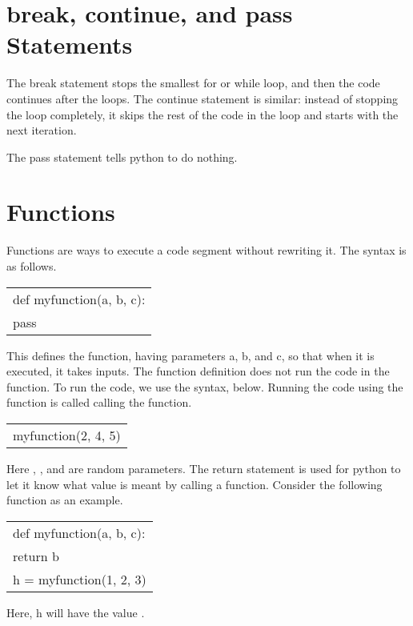 \documentclass{article}
\newcommand{\icode}[1]{{\ttfamily #1}}
\begin{document}
\section{\icode{break}, \icode{continue}, and \icode{pass} Statements}
The \icode{break} statement stops the smallest \icode{for} or \icode{while} loop, and then the code continues after the loops. The \icode{continue} statement is similar: instead of stopping the loop completely, it skips the rest of the code in the loop and starts with the next iteration.

The \icode{pass} statement tells python to do nothing.

\section{Functions}
Functions are ways to execute a code segment without rewriting it. The syntax is as follows.

\begin{center} \ttfamily
	\begin{tabular}{|l}
		def myfunction(a, b, c):\\
		\hspace{2 em}pass
	\end{tabular}
\end{center}
This defines the function, having parameters \icode{a}, \icode{b}, and \icode{c}, so that when it is executed, it takes inputs. The function definition does not run the code in the function. To run the code, we use the syntax, below. Running the code using the function is called calling the function.

\begin{center} \ttfamily
	\begin{tabular}{|l}
		myfunction(2, 4, 5)
	\end{tabular}
\end{center}
Here \icode{2}, \icode{4}, and \icode{5} are random parameters. The \icode{return} statement is used for python to let it know what value is meant by calling a function. Consider the following function as an example.

\begin{center} \ttfamily
	\begin{tabular}{|l}
		def myfunction(a, b, c):\\
		\hspace{2 em}return b\\
		h = myfunction(1, 2, 3)
	\end{tabular}
\end{center}
Here, \icode{h} will have the value \icode{2}.
\end{document}
